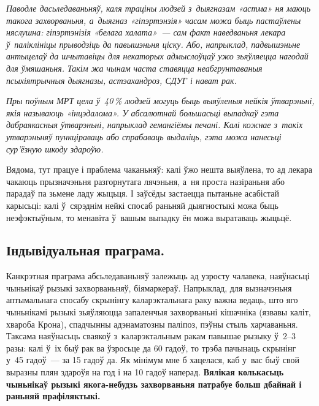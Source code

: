 \emph{Паводле дасьледаваньняў, каля траціны людзей з~дыягназам «астма» ня маюць такога захворваньня, а~дыягназ «гіпэртэнзія» часам можа быць пастаўлены няслушна: гіпэртэнізія «белага халата»~--- сам факт наведваньня лекара ў~паліклініцы прыводзіць да павышэньня ціску. Або, напрыклад, падвышэньне антыцелаў да шчытавіцы для некаторых адмыслоўцаў ужо зьяўляецца нагодай для ўмяшаньня. Такім жа чынам часта ставяцца неабгрунтаваныя псыхіятрычныя дыягназы, астэахандроз, СДУГ і нават рак.}

\emph{Пры поўным МРТ цела ў~40\,\% людзей могуць быць выяўленыя нейкія ўтварэньні, якія называюць «інцэдалома». У абсалютнай большасьці выпадкаў гэта дабраякасныя ўтварэньні, напрыклад гемангіёмы печані. Калі кожнае з~такіх утварэньняў пункціраваць або спрабаваць выдаліць, гэта можа нанесьці сур'ёзную шкоду здароўю.}

Вядома, тут працуе і праблема чаканьняў: калі ўжо нешта выяўлена, то ад лекара чакаюць прызначэньня разгорнутага лячэньня, а~ня проста назіраньня або парадаў па зьмене ладу жыцьця. І заўсёды застаецца пытаньне асабістай карысьці: калі ў~сярэднім нейкі спосаб раньняй дыягностыкі можа быць неэфэктыўным, то менавіта ў~вашым выпадку ён можа выратаваць жыцьцё.

\subsection*{Індывідуальная праграма.}

Канкрэтная праграма абсьледаваньняў залежыць ад узросту чалавека, наяўнасьці чыньнікаў рызыкі захворваньняў, біямаркераў. Напрыклад, для вызначэньня аптымальнага спосабу скрынінгу каларэктальнага раку важна ведаць, што яго чыньнікамі рызыкі зьяўляюцца запаленчыя захворваньні кішачніка (язвавы каліт, хвароба Крона), спадчынны адэнаматозны паліпоз, пэўны стыль харчаваньня. Таксама наяўнасьць сваякоў з~каларэктальным ракам павышае рызыку ў~2--3 разы: калі ў~іх быў рак ва ўзросьце да 60 гадоў, то трэба пачынаць скрынінг у~45 гадоў~--- за 15 гадоў да. Як мінімум мне б хацелася, каб у~вас быў свой выразны плян здароўя на год і на 10 гадоў наперад. \textbf{Вялікая колькасьць чыньнікаў рызыкі якога-небудзь захворваньня патрабуе больш дбайнай і раньняй прафіляктыкі.}


